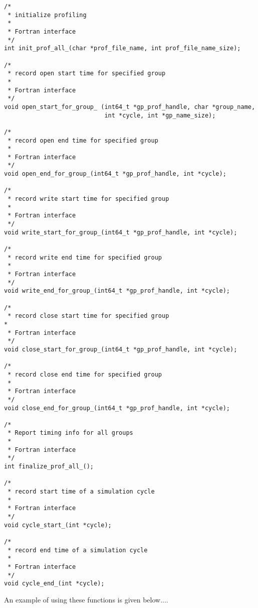 \begin{lstlisting}[frame=single, backgroundcolor=\color{gray85}]
/*
 * initialize profiling 
 *
 * Fortran interface
 */
int init_prof_all_(char *prof_file_name, int prof_file_name_size);

/*
 * record open start time for specified group
 *
 * Fortran interface
 */
void open_start_for_group_ (int64_t *gp_prof_handle, char *group_name, 
                            int *cycle, int *gp_name_size);

/*
 * record open end time for specified group
 *
 * Fortran interface
 */
void open_end_for_group_(int64_t *gp_prof_handle, int *cycle);

/*
 * record write start time for specified group
 *
 * Fortran interface
 */
void write_start_for_group_(int64_t *gp_prof_handle, int *cycle);

/*
 * record write end time for specified group
 *
 * Fortran interface
 */
void write_end_for_group_(int64_t *gp_prof_handle, int *cycle);

/*
 * record close start time for specified group
*
 * Fortran interface
 */
void close_start_for_group_(int64_t *gp_prof_handle, int *cycle);

/*
 * record close end time for specified group
 *
 * Fortran interface
 */
void close_end_for_group_(int64_t *gp_prof_handle, int *cycle);

/*
 * Report timing info for all groups
 *
 * Fortran interface  
 */
int finalize_prof_all_();

/*
 * record start time of a simulation cycle
 *
 * Fortran interface 
 */
void cycle_start_(int *cycle);

/*
 * record end time of a simulation cycle
 *
 * Fortran interface 
 */
void cycle_end_(int *cycle);

\end{lstlisting}

An example of using these functions is given below....

